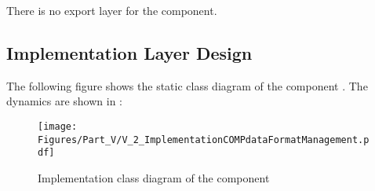 There is no export layer for the \COMPdataFormatManagement{} component.


\subsection{Implementation Layer Design}
\label{sec:ImplementationDesignCOMPdataFormatManagement}

The following figure shows the static class diagram of the component \COMPdataFormatManagement{}. The dynamics are shown in :

\begin{figure}[H]
	\centering
	\texttt{[image: Figures/Part\_V/V\_2\_ImplementationCOMPdataFormatManagement.pdf]}
	\caption{Implementation class diagram of the component \COMPdataFormatManagement{}}
	\label{fig:V_2_ImplementationCOMPdataFormatManagement}
\end{figure}



%
%
